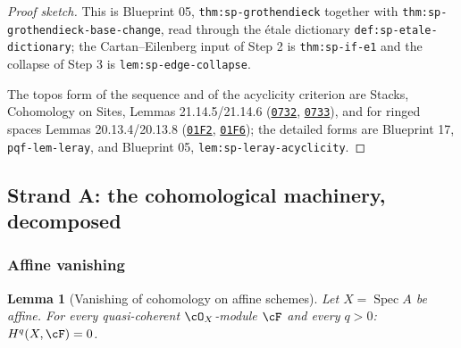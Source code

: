 \documentclass[11pt]{article}
\theoremstyle{plain}
\newtheorem{lemma}[theorem]{Lemma}
\theoremstyle{definition}
\DeclareMathOperator{\Spec}{Spec}
\begin{document}
\begin{proof}[Proof sketch]
This is Blueprint 05, \texttt{thm:sp-grothendieck} together with
\texttt{thm:sp-grothendieck-base-change}, read through the \'etale
dictionary \texttt{def:sp-etale-dictionary};  the Cartan--Eilenberg input
of Step 2 is \texttt{thm:sp-if-e1} and the collapse of Step 3 is
\texttt{lem:sp-edge-collapse}.

The topos form of the sequence and of the acyclicity criterion are
Stacks, Cohomology on Sites, Lemmas 21.14.5/21.14.6
(\href{https://stacks.math.columbia.edu/tag/0732}{\texttt{0732}},
\href{https://stacks.math.columbia.edu/tag/0733}{\texttt{0733}}), and
for ringed spaces Lemmas 20.13.4/20.13.8
(\href{https://stacks.math.columbia.edu/tag/01F2}{\texttt{01F2}},
\href{https://stacks.math.columbia.edu/tag/01F6}{\texttt{01F6}});  the
detailed forms are Blueprint 17, \texttt{pqf-lem-leray}, and Blueprint
05, \texttt{lem:sp-leray-acyclicity}.
\end{proof}


\subsection{Strand A: the cohomological machinery, decomposed}

\subsubsection{Affine vanishing}

\begin{lemma}[Vanishing of cohomology on affine schemes]
\label{lem:picard-affine}
Let $X=\Spec A$ be affine.  For every quasi-coherent
$\cO_X$-module $\cF$ and every $q>0$: $H^q(X,\cF)=0$.
\end{lemma}
\end{document}
